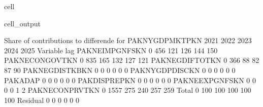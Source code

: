 \documentclass[letterpaper,10pt,english]{jupyterBook}
\begin{document}
\begin{sphinxuseclass}{cell}
\begin{sphinxVerbatimOutput}
\begin{sphinxuseclass}{cell_output}
\begin{sphinxVerbatim}[commandchars=\\\{\}]
 Share of contributions to differende for  PAKNYGDPMKTPKN
                          2021        2022        2023        2024        2025
Variable       lag                                                            
PAKNEIMPGNFSKN 0          456\PYGZpc{}        121\PYGZpc{}        126\PYGZpc{}        144\PYGZpc{}        150\PYGZpc{}
PAKNECONGOVTKN 0          835\PYGZpc{}        165\PYGZpc{}        132\PYGZpc{}        127\PYGZpc{}        121\PYGZpc{}
PAKNEGDIFTOTKN 0          366\PYGZpc{}         88\PYGZpc{}         82\PYGZpc{}         87\PYGZpc{}         90\PYGZpc{}
PAKNEGDISTKBKN 0           \PYGZhy{}0\PYGZpc{}         \PYGZhy{}0\PYGZpc{}          0\PYGZpc{}          0\PYGZpc{}         \PYGZhy{}0\PYGZpc{}
PAKNYGDPDISCKN 0           \PYGZhy{}0\PYGZpc{}         \PYGZhy{}0\PYGZpc{}          0\PYGZpc{}          0\PYGZpc{}         \PYGZhy{}0\PYGZpc{}
PAKADAP        0           \PYGZhy{}0\PYGZpc{}         \PYGZhy{}0\PYGZpc{}          0\PYGZpc{}          0\PYGZpc{}         \PYGZhy{}0\PYGZpc{}
PAKDISPREPKN   0           \PYGZhy{}0\PYGZpc{}         \PYGZhy{}0\PYGZpc{}          0\PYGZpc{}          0\PYGZpc{}         \PYGZhy{}0\PYGZpc{}
PAKNEEXPGNFSKN 0            0\PYGZpc{}         \PYGZhy{}0\PYGZpc{}         \PYGZhy{}0\PYGZpc{}         \PYGZhy{}1\PYGZpc{}         \PYGZhy{}2\PYGZpc{}
PAKNECONPRVTKN 0        \PYGZhy{}1557\PYGZpc{}       \PYGZhy{}275\PYGZpc{}       \PYGZhy{}240\PYGZpc{}       \PYGZhy{}257\PYGZpc{}       \PYGZhy{}259\PYGZpc{}
Total          0          100\PYGZpc{}        100\PYGZpc{}        100\PYGZpc{}        100\PYGZpc{}        100\PYGZpc{}
Residual       0           \PYGZhy{}0\PYGZpc{}         \PYGZhy{}0\PYGZpc{}          0\PYGZpc{}          0\PYGZpc{}         \PYGZhy{}0\PYGZpc{}


\end{sphinxVerbatim}
\end{sphinxuseclass}
\end{sphinxVerbatimOutput}
\end{sphinxuseclass}
\end{document}
